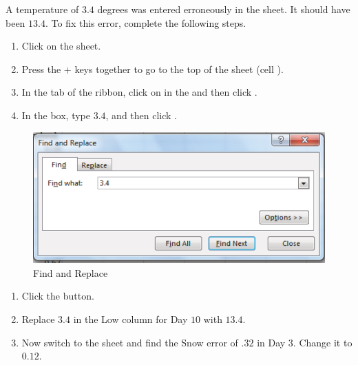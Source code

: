A temperature of $ 3.4 $ degrees was entered erroneously in the  sheet. It should have been $ 13.4 $. To fix this error, complete the following steps.

\begin{enumerate}
	\item Click on the  sheet.
	\item Press the + keys together to go to the top of the sheet (cell ).
	\item In the  tab of the ribbon, click on  in the  and then click .
	\item In the  box, type $ 3.4 $, and then click .
\end{enumerate}

\begin{figure}[H]
	\centering
	\includegraphics[width=\maxwidth{.95\linewidth}]{gfx/ch05_fig06}
	\caption{Find and Replace}
	\label{05:fig06}
\end{figure}

\begin{enumerate}
	\item Click the  button.
	\item Replace $ 3.4 $ in the Low column for Day $ 10 $ with $ 13.4 $.
	\item Now switch to the  sheet and find the Snow error of $ .32 $ in Day $ 3 $. Change it to $ 0.12 $. 
\end{enumerate}

